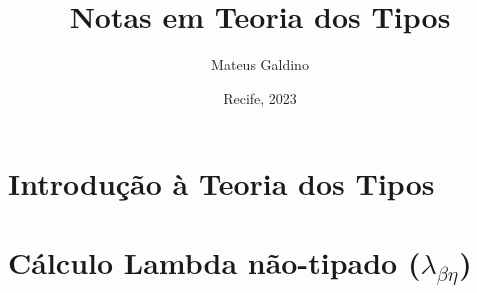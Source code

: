 \documentclass{article}
\title{Notas em Teoria dos Tipos}
\author{Mateus Galdino}
\date{Recife, 2023}
\theoremstyle{definition}
\theoremstyle{lemma}
\begin{document}
    \maketitle

    \tableofcontents

    \newpage

        

    \newpage

    \section{Introdução à Teoria dos Tipos}
        
    \newpage

    \section{Cálculo Lambda não-tipado ($\lambda_{\beta\eta}$)}
        
    \newpage
\end{document}
